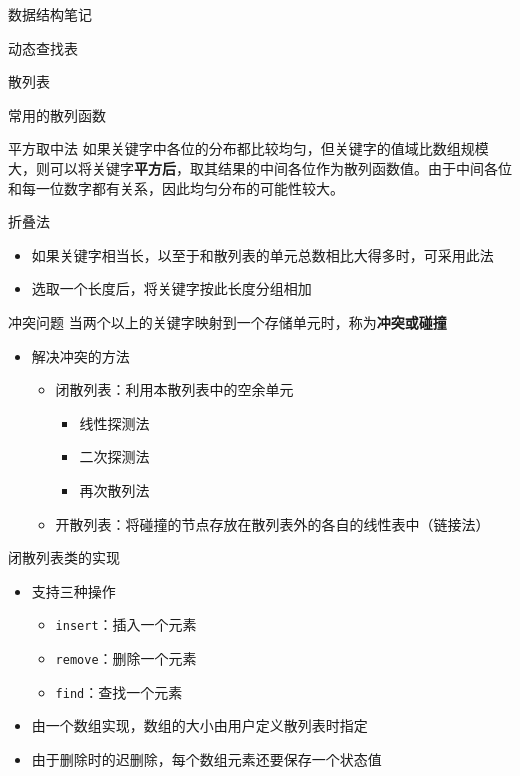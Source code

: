 \documentclass[
  ignorenonframetext,
]{beamer}
\providecommand{\tightlist}{%
  \setlength{\itemsep}{0pt}\setlength{\parskip}{0pt}}
\begin{document}
\begin{frame}[fragile]{数据结构笔记}
\begin{block}{动态查找表}
\begin{block}{散列表}
\begin{block}{常用的散列函数}
\begin{block}{平方取中法}
\protect{}\label{ux5e73ux65b9ux53d6ux4e2dux6cd5}
如果关键字中各位的分布都比较均匀，但关键字的值域比数组规模大，则可以将关键字\textbf{平方后}，取其结果的中间各位作为散列函数值。由于中间各位和每一位数字都有关系，因此均匀分布的可能性较大。
\end{block}

\begin{block}{折叠法}
\protect{}\label{ux6298ux53e0ux6cd5}
\begin{itemize}
\tightlist
\item
  如果关键字相当长，以至于和散列表的单元总数相比大得多时，可采用此法
\item
  选取一个长度后，将关键字按此长度分组相加
\end{itemize}
\end{block}
\end{block}

\begin{block}{冲突问题}
\protect{}\label{ux51b2ux7a81ux95eeux9898}
当两个以上的关键字映射到一个存储单元时，称为\textbf{冲突或碰撞}

\begin{itemize}
\tightlist
\item
  解决冲突的方法

  \begin{itemize}
  \tightlist
  \item
    闭散列表：利用本散列表中的空余单元

    \begin{itemize}
    \tightlist
    \item
      线性探测法
    \item
      二次探测法
    \item
      再次散列法
    \end{itemize}
  \item
    开散列表：将碰撞的节点存放在散列表外的各自的线性表中（链接法）
  \end{itemize}
\end{itemize}

\begin{block}{闭散列表类的实现}
\protect{}\label{ux95edux6563ux5217ux8868ux7c7bux7684ux5b9eux73b0}
\begin{itemize}
\tightlist
\item
  支持三种操作

  \begin{itemize}
  \tightlist
  \item
    \texttt{insert}：插入一个元素
  \item
    \texttt{remove}：删除一个元素
  \item
    \texttt{find}：查找一个元素
  \end{itemize}
\item
  由一个数组实现，数组的大小由用户定义散列表时指定
\item
  由于删除时的迟删除，每个数组元素还要保存一个状态值


\end{itemize}
\end{block}
\end{block}
\end{block}
\end{block}
\end{frame}
\end{document}
